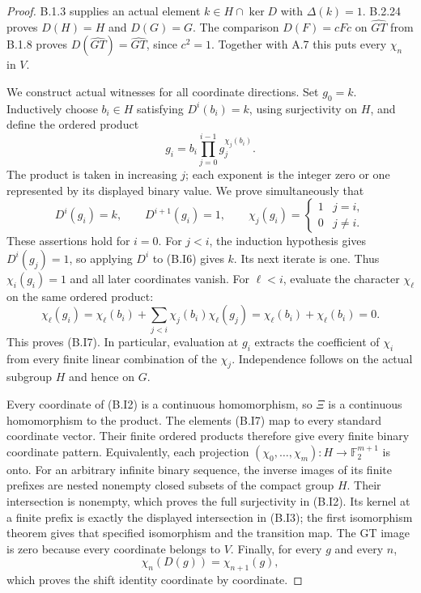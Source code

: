\begin{proof}
B.1.3 supplies an actual element $k\in H\cap\ker D$ with
$\Delta(k)=1$.  B.2.24 proves $D(H)=H$ and $D(G)=G$.
The comparison $D(F)=cFc$ on $\widehat{GT}$ from B.1.8
proves $D(\widehat{GT})=\widehat{GT}$, since $c^2=1$.
Together with A.7 this puts every $\chi_n$ in $V$.

We construct actual witnesses for all coordinate directions.
Set $g_0=k$.  Inductively choose $b_i\in H$ satisfying
$D^i(b_i)=k$, using surjectivity on $H$, and define the ordered
product
\[
              g_i=b_i\prod_{j=0}^{i-1}g_j^{\chi_j(b_i)}.
                                                        \tag{B.I6}
\]
The product is taken in increasing $j$; each exponent is the
integer zero or one represented by its displayed binary value.
We prove simultaneously that
\[
 D^i(g_i)=k,\qquad D^{i+1}(g_i)=1,\qquad
                   \chi_j(g_i)=\begin{cases}1&j=i,\\0&j\ne i.
                                  \end{cases}             \tag{B.I7}
\]
These assertions hold for $i=0$.  For $j<i$, the induction
hypothesis gives $D^i(g_j)=1$, so applying $D^i$ to (B.I6)
gives $k$.  Its next iterate is one.  Thus $\chi_i(g_i)=1$
and all later coordinates vanish.  For $\ell<i$, evaluate
the character $\chi_\ell$ on the same ordered product:
\[
 \chi_\ell(g_i)=\chi_\ell(b_i)+
       \sum_{j<i}\chi_j(b_i)\chi_\ell(g_j)
       =\chi_\ell(b_i)+\chi_\ell(b_i)=0.
                                                        \tag{B.I8}
\]
This proves (B.I7).  In particular, evaluation at $g_i$
extracts the coefficient of $\chi_i$ from every finite
linear combination of the $\chi_j$.  Independence follows
on the actual subgroup $H$ and hence on $G$.

Every coordinate of (B.I2) is a continuous homomorphism, so
$\Xi$ is a continuous homomorphism to the product.  The
elements (B.I7) map to every standard coordinate vector.
Their finite ordered products therefore give every finite
binary coordinate pattern.  Equivalently, each projection
$(\chi_0,\ldots,\chi_m):H\to\mathbb F_2^{m+1}$ is onto.
For an arbitrary infinite binary sequence, the inverse
images of its finite prefixes are nested nonempty closed
subsets of the compact group $H$.  Their intersection is
nonempty, which proves the full surjectivity in (B.I2).
Its kernel at a finite prefix is exactly the displayed
intersection in (B.I3); the first isomorphism theorem gives
that specified isomorphism and the transition map.
The GT image is zero because every coordinate belongs to
$V$.  Finally, for every $g$ and every $n$,
\[
                  \chi_n(D(g))=\chi_{n+1}(g),
                                                        \tag{B.I9}
\]
which proves the shift identity coordinate by coordinate.


\end{proof}
